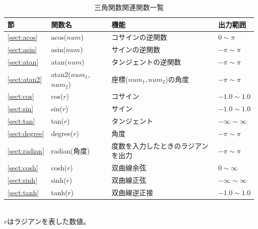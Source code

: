 \begin{table}[!hb]
\begin{center}
\caption{三角関数関連関数一覧\label{tbl:mcal_sankaku}}
{\small
  \begin{tabular}{l|l|l|l} \hline
節&関数名&機能&出力範囲\\ \hline

\ref{sect:acos}& acos($num$)&
コサインの逆関数&
$0\sim\pi$\\

\ref{sect:asin}& asin($num$)&
サインの逆関数&
$-\pi\sim\pi$\\

\ref{sect:atan}& atan($num$)&
タンジェントの逆関数&
$-\pi\sim\pi$\\

\ref{sect:atan2}& atan2($num_1$,$num_2$)&
座標($num_1,num_2$)の角度&
$-\pi\sim\pi$\\

\ref{sect:cos}& cos($r$)&
コサイン&
$-1.0\sim 1.0$\\

\ref{sect:sin}& sin($r$)&
サイン&
$-1.0\sim 1.0$\\

\ref{sect:tan}& tan($r$)&
タンジェント&
$-\infty\sim\infty$\\

\ref{sect:degree}& degree($r$)&
角度&
$-\pi\sim\pi$\\

\ref{sect:radian}& radian(角度)&
度数を入力したときのラジアンを出力&
$-\pi\sim\pi$\\

\ref{sect:cosh}& cosh($r$)&
双曲線余弦&
$0\sim\infty$\\

\ref{sect:sinh}& sinh($r$)&
双曲線正弦&
$-\infty\sim\infty$\\

\ref{sect:tanh}& tanh($r$)&
双曲線逆正接&
$-1.0\sim 1.0$\\

\hline
  \end{tabular}
	\\$r$はラジアンを表した数値。
  }
  \end{center}
\end{table}



